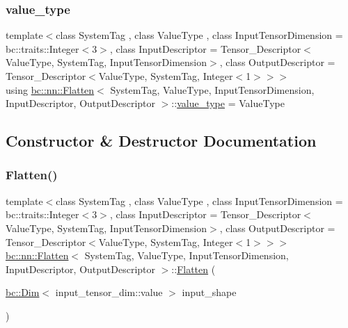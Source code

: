 \subsubsection{\texorpdfstring{value\+\_\+type}{value\_type}}
{\footnotesize\ttfamily template$<$class System\+Tag , class Value\+Type , class Input\+Tensor\+Dimension  = bc\+::traits\+::\+Integer$<$3$>$, class Input\+Descriptor  = Tensor\+\_\+\+Descriptor$<$\+Value\+Type, System\+Tag, Input\+Tensor\+Dimension$>$, class Output\+Descriptor  = Tensor\+\_\+\+Descriptor$<$\+Value\+Type, System\+Tag, Integer$<$1$>$$>$$>$ \\
using \hyperlink{structbc_1_1nn_1_1Flatten}{bc\+::nn\+::\+Flatten}$<$ System\+Tag, Value\+Type, Input\+Tensor\+Dimension, Input\+Descriptor, Output\+Descriptor $>$\+::\hyperlink{structbc_1_1nn_1_1Flatten_af6a4f22abc0a8e8f8bb1624abd97b500}{value\+\_\+type} =  Value\+Type}



\subsection{Constructor \& Destructor Documentation}
\mbox{\label{structbc_1_1nn_1_1Flatten_a89db66a90f1de37dce20b230c631199c}} 
\subsubsection{\texorpdfstring{Flatten()}{Flatten()}}
{\footnotesize\ttfamily template$<$class System\+Tag , class Value\+Type , class Input\+Tensor\+Dimension  = bc\+::traits\+::\+Integer$<$3$>$, class Input\+Descriptor  = Tensor\+\_\+\+Descriptor$<$\+Value\+Type, System\+Tag, Input\+Tensor\+Dimension$>$, class Output\+Descriptor  = Tensor\+\_\+\+Descriptor$<$\+Value\+Type, System\+Tag, Integer$<$1$>$$>$$>$ \\
\hyperlink{structbc_1_1nn_1_1Flatten}{bc\+::nn\+::\+Flatten}$<$ System\+Tag, Value\+Type, Input\+Tensor\+Dimension, Input\+Descriptor, Output\+Descriptor $>$\+::\hyperlink{structbc_1_1nn_1_1Flatten}{Flatten} (\begin{DoxyParamCaption}\item[{\hyperlink{structbc_1_1Dim}{bc\+::\+Dim}$<$ input\+\_\+tensor\+\_\+dim\+::value $>$}]{input\+\_\+shape }\end{DoxyParamCaption})\hspace{0.3cm}{\ttfamily [inline]}}



